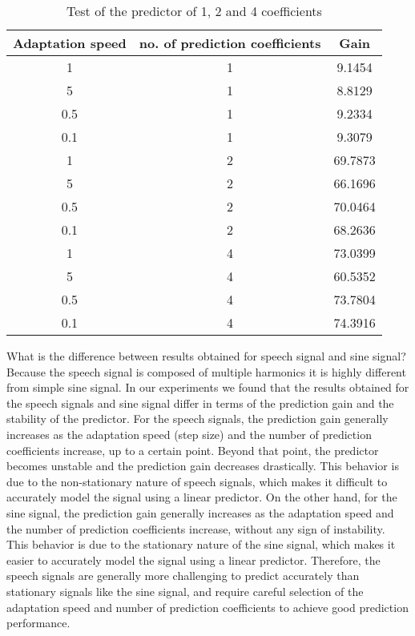 \documentclass{article}
\begin{document}
\begin{table}[ht!]
  \begin{center}
      \caption{Test of the predictor of 1, 2 and 4 coefficients}
        \label{tab:task4tab}
        \begin{tabular}{c|c|c} 
            \textbf{Adaptation speed} & \textbf{no. of prediction coefficients} 
            & \textbf{Gain} \\ \hline
            1 & 1 & 9.1454\\
            5 & 1 & 8.8129\\
            0.5 & 1 & 9.2334\\
            0.1 & 1 & 9.3079\\
            1 & 2 & 69.7873\\
            5 & 2 & 66.1696\\
            0.5 & 2 & 70.0464\\
            0.1 & 2 & 68.2636\\
            1 & 4 & 73.0399\\
            5 & 4 & 60.5352\\
            0.5 & 4 & 73.7804\\
            0.1 & 4 & 74.3916\\
    \end{tabular}
  \end{center}
\end{table}

What is the difference between results obtained for speech signal and sine signal? \\
Because the speech signal is composed of multiple harmonics it is highly
different from simple sine signal. In our experiments we found that the results
obtained for the speech signals and sine signal differ in terms of the
prediction gain and the stability of the predictor. For the speech signals, the
prediction gain generally increases as the adaptation speed (step size) and the
number of prediction coefficients increase, up to a certain point. Beyond that
point, the predictor becomes unstable and the prediction gain decreases
drastically. This behavior is due to the non-stationary nature of speech
signals, which makes it difficult to accurately model the signal using a linear
predictor. On the other hand, for the sine signal, the prediction gain
generally increases as the adaptation speed and the number of prediction
coefficients increase, without any sign of instability. This behavior is due to
the stationary nature of the sine signal, which makes it easier to accurately
model the signal using a linear predictor. Therefore, the speech signals are
generally more challenging to predict accurately than stationary signals like
the sine signal, and require careful selection of the adaptation speed and
number of prediction coefficients to achieve good prediction performance.
\end{document}
